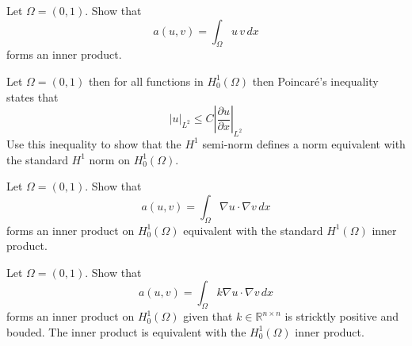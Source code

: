\begin{exercise}
\label{ex:inner}
Let $\Omega=(0,1)$.  
Show that 
\[  
a(u, v) = \int_\Omega  u \, v \, dx 
\]
forms an inner product.  
\end{exercise}




\begin{exercise}
\label{ex:poincare}

Let $\Omega=(0,1)$ then  
for all functions in $H^1_0(\Omega)$ then
Poincar\'e's inequality states that
\[
|u|_{L^2} \le C  |\frac{\partial u}{\partial x}|_{L^2}   
\]
Use this inequality to show that the $H^1$ semi-norm defines 
a norm equivalent with the standard $H^1$ norm on $H^1_0(\Omega)$.  
\end{exercise}



\begin{exercise}
\label{ex:poincare2}

Let $\Omega=(0,1)$.  
Show that 
\[  
a(u, v) = \int_\Omega \nabla u \cdot \nabla v \, dx 
\]
forms an inner product on $H^1_0(\Omega)$  equivalent with the standard
$H^1(\Omega)$ inner product. 
\end{exercise}

\begin{exercise}
\label{ex:poincare3}

Let $\Omega=(0,1)$.  
Show that 
\[  
a(u, v) = \int_\Omega k \nabla u \cdot \nabla v \, dx 
\]
forms an inner product on $H^1_0(\Omega)$ given that $k \in \mathbb{R}^{n \times n}$ is stricktly positive
and bouded. The inner product is equivalent with the $H^1_0(\Omega)$ inner product.  

\end{exercise}



